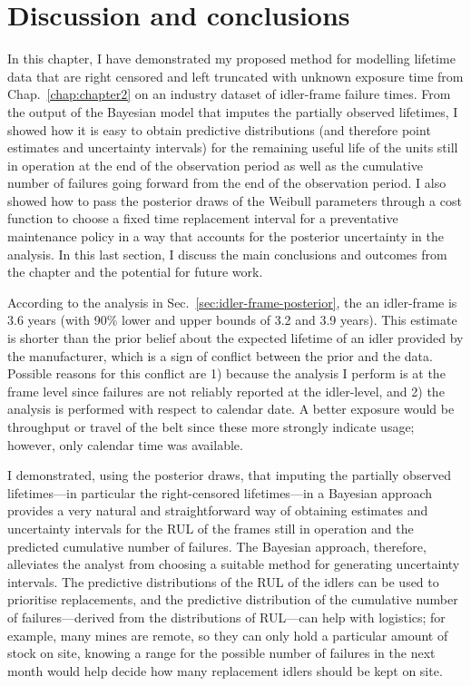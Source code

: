 \section{Discussion and conclusions} \label{sec:idler-frame-conclusions}

In this chapter, I have demonstrated my proposed method for modelling lifetime data that are right censored and left truncated with unknown exposure time from Chap.~\ref{chap:chapter2} on an industry dataset of idler-frame failure times. From the output of the Bayesian model that imputes the partially observed lifetimes, I showed how it is easy to obtain predictive distributions (and therefore point estimates and uncertainty intervals) for the remaining useful life of the units still in operation at the end of the observation period as well as the cumulative number of failures going forward from the end of the observation period. I also showed how to pass the posterior draws of the Weibull parameters through a cost function to choose a fixed time replacement interval for a preventative maintenance policy in a way that accounts for the posterior uncertainty in the analysis. In this last section, I discuss the main conclusions and outcomes from the chapter and the potential for future work. 

According to the analysis in Sec.~\ref{sec:idler-frame-posterior}, the an idler-frame is $3.6$ years (with 90\% lower and upper bounds of 3.2 and 3.9 years). This estimate is shorter than the prior belief about the expected lifetime of an idler provided by the manufacturer, which is a sign of conflict between the prior and the data. Possible reasons for this conflict are 1) because the analysis I perform is at the frame level since failures are not reliably reported at the idler-level, and 2) the analysis is performed with respect to calendar date. A better exposure would be throughput or travel of the belt since these more strongly indicate usage; however, only calendar time was available.

I demonstrated, using the posterior draws, that imputing the partially observed lifetimes---in particular the right-censored lifetimes---in a Bayesian approach provides a very natural and straightforward way of obtaining estimates and uncertainty intervals for the RUL of the frames still in operation and the predicted cumulative number of failures. The Bayesian approach, therefore, alleviates the analyst from choosing a suitable method for generating uncertainty intervals. The predictive distributions of the RUL of the idlers can be used to prioritise replacements, and the predictive distribution of the cumulative number of failures---derived from the distributions of RUL---can help with logistics; for example, many mines are remote, so they can only hold a particular amount of stock on site, knowing a range for the possible number of failures in the next month would help decide how many replacement idlers should be kept on site.

